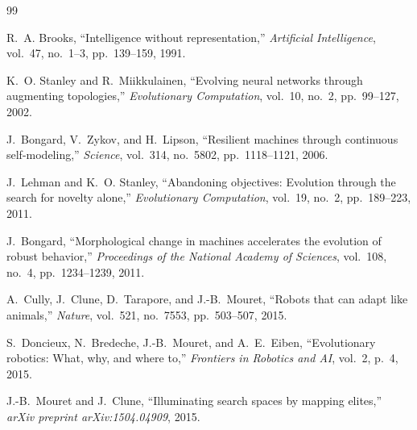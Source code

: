 \documentclass[11pt]{article}
\begin{document}
\begin{thebibliography}{99}

R.~A. Brooks, ``Intelligence without representation,'' \emph{Artificial Intelligence}, vol.~47, no.~1--3, pp.~139--159, 1991.

K.~O. Stanley and R.~Miikkulainen, ``Evolving neural networks through augmenting topologies,'' \emph{Evolutionary Computation}, vol.~10, no.~2, pp.~99--127, 2002.

J.~Bongard, V.~Zykov, and H.~Lipson, ``Resilient machines through continuous self-modeling,'' \emph{Science}, vol.~314, no.~5802, pp.~1118--1121, 2006.

J.~Lehman and K.~O. Stanley, ``Abandoning objectives: Evolution through the search for novelty alone,'' \emph{Evolutionary Computation}, vol.~19, no.~2, pp.~189--223, 2011.

J.~Bongard, ``Morphological change in machines accelerates the evolution of robust behavior,'' \emph{Proceedings of the National Academy of Sciences}, vol.~108, no.~4, pp.~1234--1239, 2011.

A.~Cully, J.~Clune, D.~Tarapore, and J.-B.~Mouret, ``Robots that can adapt like animals,'' \emph{Nature}, vol.~521, no.~7553, pp.~503--507, 2015.

S.~Doncieux, N.~Bredeche, J.-B.~Mouret, and A.~E.~Eiben, ``Evolutionary robotics: What, why, and where to,'' \emph{Frontiers in Robotics and AI}, vol.~2, p.~4, 2015.

J.-B.~Mouret and J.~Clune, ``Illuminating search spaces by mapping elites,'' \emph{arXiv preprint arXiv:1504.04909}, 2015.

\end{thebibliography}
\end{document}
